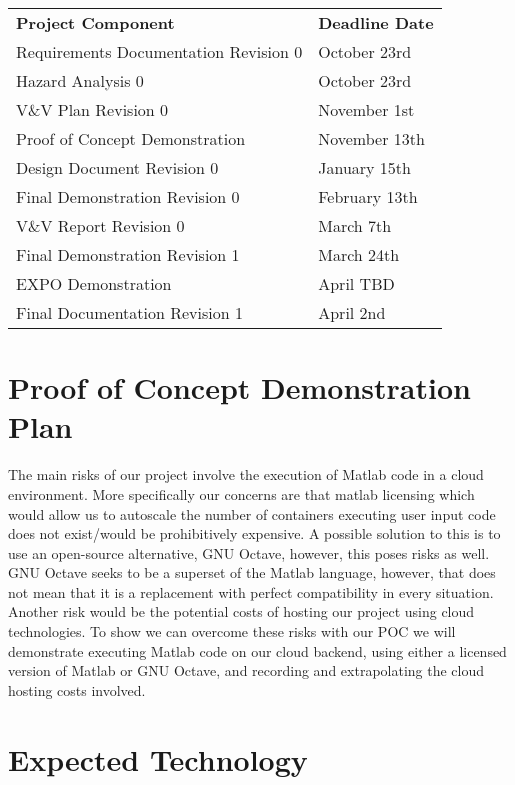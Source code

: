 \documentclass{article}
\begin{document}
\begin{table}[H]
\begin{tabular}{ll}
\textbf{Project Component}           & \textbf{Deadline Date} \\
Requirements Documentation Revision 0 & October 23rd  \\
Hazard Analysis 0                     & October 23rd  \\
V\&V Plan Revision 0                   & November 1st  \\
Proof of Concept Demonstration        & November 13th \\
Design Document Revision 0            & January 15th  \\
Final Demonstration Revision 0        & February 13th \\
V\&V Report Revision 0                 & March 7th     \\
Final Demonstration Revision 1        & March 24th    \\
EXPO Demonstration                    & April TBD     \\
Final Documentation Revision 1        & April 2nd     \\
\end{tabular}
\end{table}


\section{Proof of Concept Demonstration Plan}

The main risks of our project involve the execution of Matlab code in a cloud environment. More specifically our concerns are that matlab licensing which would allow us to autoscale the number of containers executing user input code does not exist/would be prohibitively expensive. A possible solution to this is to use an open-source alternative, GNU Octave, however, this poses risks as well. GNU Octave seeks to be a superset of the Matlab language, however, that does not mean that it is a replacement with perfect compatibility in every situation. Another risk would be the potential costs of hosting our project using cloud technologies. To show we can overcome these risks with our POC we will demonstrate executing Matlab code on our cloud backend, using either a licensed version of Matlab or GNU Octave, and recording and extrapolating the cloud hosting costs involved.

\section{Expected Technology}
\end{document}
